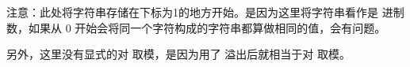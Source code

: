 \begin{information}
    注意：此处将字符串存储在下标为1的地方开始。是因为这里将字符串看作是  进制数，如果从 0 开始会将同一个字符构成的字符串都算做相同的值，会有问题。

    另外，这里没有显式的对  取模，是因为用了  溢出后就相当于对  取模。
\end{information}

